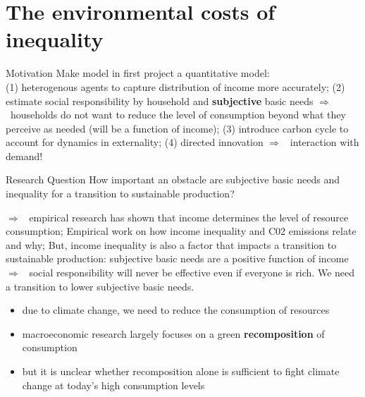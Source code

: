 \documentclass[11pt,aspectratio=169]{beamer}
\newcommand{\ar}{$\Rightarrow$ \ }
\begin{document}
\section{The environmental costs of inequality}
\begin{frame}{Motivation}
	Make model in first project a quantitative model:\\ (1) heterogenous agents to capture distribution of income more accurately;  (2) estimate social responsibility by household and \textbf{subjective} basic needs \ar households do not want to reduce the level of consumption beyond what they perceive as needed (will be a function of income);  (3) introduce carbon cycle to account for dynamics in externality; (4) directed innovation \ar interaction with demand!  \\
	
	\begin{block}{Research Question}
How important an obstacle are subjective basic needs and inequality for a transition to sustainable production?
\end{block}
	\ar empirical research has shown that income determines the level of resource consumption; Empirical work on how income inequality and C02 emissions relate and why; But, income inequality is also a factor that impacts a transition to sustainable production: subjective basic needs are a positive function of income \ar social responsibility will never be effective even if everyone is rich. We need a transition to lower subjective basic needs. 
	
	\begin{itemize}[<+-| alert@+>]
		
		\item<+-| alert@+> due to climate change, we need to reduce the consumption of resources
		\vspace{4mm}
		\item<+-| alert@+> macroeconomic research largely focuses on a green \textbf{\textcolor{cyan!100}{recomposition}} of consumption 
		\vspace{4mm}
		\item<+-| alert@+>  but it is unclear whether recomposition alone is sufficient to fight climate change at today's high consumption levels%
		

\end{itemize}
\end{frame}
\end{document}
